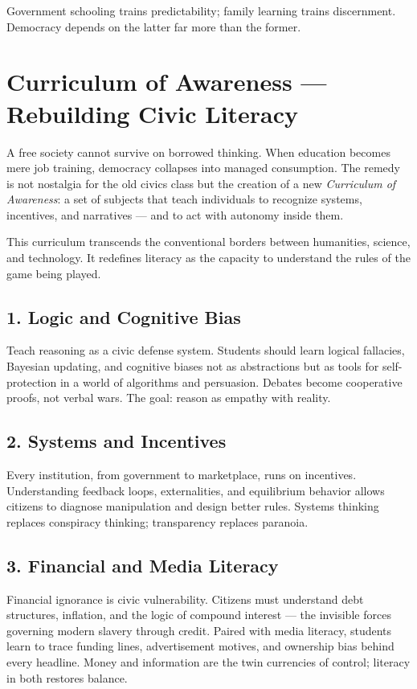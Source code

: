 \documentclass[12pt,twoside]{book}
\begin{document}
\begin{keyidea}
Government schooling trains predictability; family learning trains discernment.  
Democracy depends on the latter far more than the former.
\end{keyidea}
\section{Curriculum of Awareness — Rebuilding Civic Literacy}

A free society cannot survive on borrowed thinking.  
When education becomes mere job training, democracy collapses into managed consumption.  
The remedy is not nostalgia for the old civics class but the creation of a new \emph{Curriculum of Awareness}: a set of subjects that teach individuals to recognize systems, incentives, and narratives — and to act with autonomy inside them.

This curriculum transcends the conventional borders between humanities, science, and technology.  
It redefines literacy as the capacity to understand the rules of the game being played.

\subsection*{1. Logic and Cognitive Bias}
Teach reasoning as a civic defense system.  
Students should learn logical fallacies, Bayesian updating, and cognitive biases not as abstractions but as tools for self-protection in a world of algorithms and persuasion.  
Debates become cooperative proofs, not verbal wars.  
The goal: reason as empathy with reality.

\subsection*{2. Systems and Incentives}
Every institution, from government to marketplace, runs on incentives.  
Understanding feedback loops, externalities, and equilibrium behavior allows citizens to diagnose manipulation and design better rules.  
Systems thinking replaces conspiracy thinking; transparency replaces paranoia.

\subsection*{3. Financial and Media Literacy}
Financial ignorance is civic vulnerability.  
Citizens must understand debt structures, inflation, and the logic of compound interest — the invisible forces governing modern slavery through credit.  
Paired with media literacy, students learn to trace funding lines, advertisement motives, and ownership bias behind every headline.  
Money and information are the twin currencies of control; literacy in both restores balance.
\end{document}
